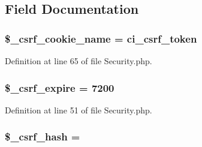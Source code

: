 \subsection{Field Documentation}
\subsubsection[{\texorpdfstring{\$\+\_\+csrf\+\_\+cookie\+\_\+name}{$_csrf_cookie_name}}]{\setlength{\rightskip}{0pt plus 5cm}\$\+\_\+csrf\+\_\+cookie\+\_\+name = \textquotesingle{}ci\+\_\+csrf\+\_\+token\textquotesingle{}\hspace{0.3cm}{\ttfamily [protected]}}\hypertarget{class_c_i___security_a52043f2c9ffb0e14eade8e67a0172a82}{}\label{class_c_i___security_a52043f2c9ffb0e14eade8e67a0172a82}


Definition at line 65 of file Security.\+php.

\subsubsection[{\texorpdfstring{\$\+\_\+csrf\+\_\+expire}{$_csrf_expire}}]{\setlength{\rightskip}{0pt plus 5cm}\$\+\_\+csrf\+\_\+expire = 7200\hspace{0.3cm}{\ttfamily [protected]}}\hypertarget{class_c_i___security_af86a83f20de2a3c522bf690d4080c08e}{}\label{class_c_i___security_af86a83f20de2a3c522bf690d4080c08e}


Definition at line 51 of file Security.\+php.

\subsubsection[{\texorpdfstring{\$\+\_\+csrf\+\_\+hash}{$_csrf_hash}}]{\setlength{\rightskip}{0pt plus 5cm}\$\+\_\+csrf\+\_\+hash = \textquotesingle{}\textquotesingle{}\hspace{0.3cm}{\ttfamily [protected]}}\hypertarget{class_c_i___security_a8bf24cc529f04164ac20d892ce20d721}{}\label{class_c_i___security_a8bf24cc529f04164ac20d892ce20d721}


